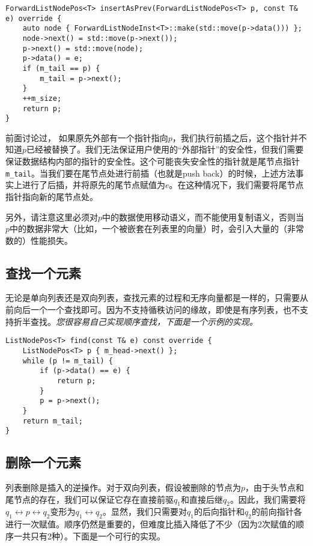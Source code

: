 \begin{lstlisting}
ForwardListNodePos<T> insertAsPrev(ForwardListNodePos<T> p, const T& e) override {
    auto node { ForwardListNodeInst<T>::make(std::move(p->data())) };
    node->next() = std::move(p->next());
    p->next() = std::move(node);
    p->data() = e;
    if (m_tail == p) {
        m_tail = p->next();
    }
    ++m_size;
    return p;
}
\end{lstlisting}

前面讨论过，
如果原先外部有一个指针指向$p$，我们执行前插之后，这个指针并不知道$p$已经被替换了。我们无法保证用户使用的“外部指针”的安全性，但我们需要保证数据结构内部的指针的安全性。这个可能丧失安全性的指针就是尾节点指针\lstinline{m_tail}。当我们要在尾节点处进行前插（也就是push back）的时候，上述方法事实上进行了后插，并将原先的尾节点赋值为$e$。在这种情况下，我们需要将尾节点指针指向新的尾节点处。

另外，请注意这里必须对$p$中的数据使用移动语义，而不能使用复制语义，否则当$p$中的数据非常大（比如，一个被嵌套在列表里的向量）时，会引入大量的（非常数的）性能损失。

\subsection{查找一个元素}

无论是单向列表还是双向列表，查找元素的过程和无序向量都是一样的，只需要从前向后一个一个查找即可。因为不支持循秩访问的缘故，即使是有序列表，也不支持折半查找。\textit{您很容易自己实现顺序查找，下面是一个示例的实现。}

\begin{lstlisting}
ListNodePos<T> find(const T& e) const override {
    ListNodePos<T> p { m_head->next() };
    while (p != m_tail) {
        if (p->data() == e) {
            return p;
        }
        p = p->next();
    }
    return m_tail;
}
\end{lstlisting}

\subsection{删除一个元素}

列表删除是插入的逆操作。对于双向列表，假设被删除的节点为$p$，由于头节点和尾节点的存在，我们可以保证它存在直接前驱$q_1$和直接后继$q_2$。因此，我们需要将$q_1\leftrightarrow p \leftrightarrow q_2$变形为$q_1\leftrightarrow q_2$。显然，我们只需要对$q_1$的后向指针和$q_2$的前向指针各进行一次赋值。顺序仍然是重要的，但难度比插入降低了不少（因为2次赋值的顺序一共只有2种）。下面是一个可行的实现。

